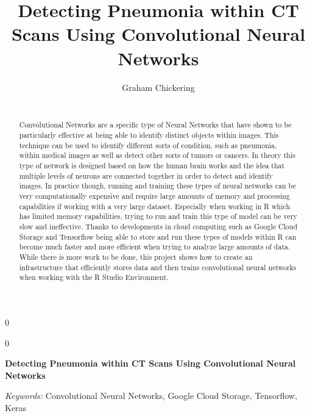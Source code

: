 \documentclass[12pt]{article}
\newcommand{\blind}{0}
\begin{document}
\def\spacingset#1{\renewcommand{\baselinestretch}%
{#1}\small\normalsize} \spacingset{1}



\blind
{
  \title{\bf Detecting Pneumonia within CT Scans Using Convolutional Neural Networks}

  \author{
        Graham Chickering \\
    \\
      }
  \maketitle
} \fi

\blind
{
  \bigskip
  \bigskip
  \bigskip
  \begin{center}
    {\LARGE\bf Detecting Pneumonia within CT Scans Using Convolutional Neural Networks}
  \end{center}
  \medskip
} \fi

\bigskip
\begin{abstract}
Convolutional Networks are a specific type of Neural Networks that have
shown to be particularly effective at being able to identify distinct
objects within images. This technique can be used to identify different
sorts of condition, such as pneumonia, within medical images as well as
detect other sorts of tumors or cancers. In theory this type of network
is designed based on how the human brain works and the idea that
multiple levels of neurons are connected together in order to detect and
identify images. In practice though, running and training these types of
neural networks can be very computationally expensive and require large
amounts of memory and processing capabilities if working with a very
large dataset. Especially when working in R which has limited memory
capabilities, trying to run and train this type of model can be very
slow and ineffective. Thanks to developments in cloud computing such as
Google Cloud Storage and Tensorflow being able to store and run these
types of models within R can become much faster and more efficient when
trying to analyze large amounts of data. While there is more work to be
done, this project shows how to create an infrastructure that
efficiently stores data and then trains convolutional neural networks
when working with the R Studio Environment.
\end{abstract}

\noindent%
{\it Keywords:} Convolutional Neural Networks, Google Cloud Storage, Tensorflow, Keras
\vfill
\end{document}
